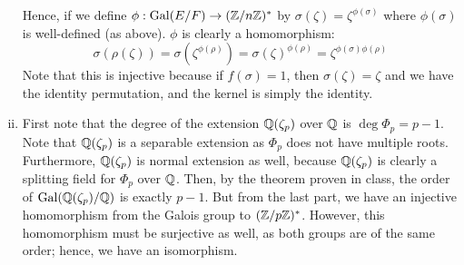 \documentclass{../../mathnotes}
\begin{document}
\begin{enumerate}[(i)]
        Hence, if we define $\phi:\operatorname{Gal}(E/F)\to(\mathbb{Z}/n\mathbb{Z})^*$ by $\sigma(\zeta)=\zeta^{\phi(\sigma)}$ where
        $\phi(\sigma)$ is well-defined (as above). $\phi$ is clearly a homomorphism:
        \[\sigma(\rho(\zeta))=\sigma(\zeta^{\phi(\rho)})=\sigma(\zeta)^{\phi(\rho)}=\zeta^{\phi(\sigma)\phi(\rho)}\]
        Note that this is injective because if $f(\sigma)=1$, then $\sigma(\zeta)=\zeta$ and we have the identity
        permutation, and the kernel is simply the identity.
    \item First note that the degree of the extension $\mathbb{Q}(\zeta_p)$ over $\mathbb{Q}$ is $\deg\Phi_p=p-1$. Note that
        $\mathbb{Q}(\zeta_p)$ is a separable extension as $\Phi_p$ does not have multiple roots. Furthermore,
        $\mathbb{Q}(\zeta_p)$ is normal extension as well, because $\mathbb{Q}(\zeta_p)$ is clearly a splitting field for
        $\Phi_p$ over $\mathbb{Q}$. Then, by the theorem proven in class, the order of $\operatorname{Gal}(\mathbb{Q}(\zeta_p)/\mathbb{Q})$
        is exactly $p-1$. But from the last part, we have an injective homomorphism from the Galois group
        to $(\mathbb{Z}/p\mathbb{Z})^*$. However, this homomorphism must be surjective as well, as both groups are of the same
        order; hence, we have an isomorphism.
\end{enumerate}
\end{document}
